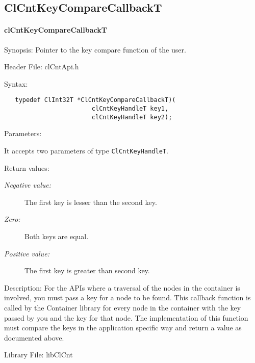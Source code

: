 \subsection{ClCntKeyCompareCallbackT}
\hypertarget{pagecnt119}{}\paragraph{cl\-Cnt\-Key\-Compare\-CallbackT}\label{pagecnt119}
\begin{Desc}
\item[Synopsis:]Pointer to the key compare function of the user. \end{Desc}
\begin{Desc}
\item[Header File:]clCntApi.h\end{Desc}
\begin{Desc}
\item[Syntax:]

\footnotesize\begin{verbatim}   typedef ClInt32T *ClCntKeyCompareCallbackT)(
						clCntKeyHandleT key1,
						clCntKeyHandleT key2);

\end{verbatim}
\normalsize
\end{Desc}
\begin{Desc}
\item[Parameters:]
\begin{description}
It accepts two parameters of type {\tt{ClCntKeyHandleT}}.\end{description}
\end{Desc}
\begin{Desc}
\item[Return values:]
\begin{description}
\item[{\em Negative value:}]The first key is lesser than the second key.
\item[{\em Zero:}] Both keys are equal.
\item[{\em Positive value:}]The first key is greater than second key. 
\end{description}
\end{Desc}
\begin{Desc}
\item[Description:]
For the APIs where a traversal of the nodes in the container is involved, you must pass a key for a node to be found. This callback function is called by 
the Container library for every node in the container with the key passed by you and the key for that node. The implementation of this function must 
compare the keys in the application specific way and return a value as documented above.
\end{Desc}
\begin{Desc}
\item[Library File:]lib\-Cl\-Cnt\end{Desc}


